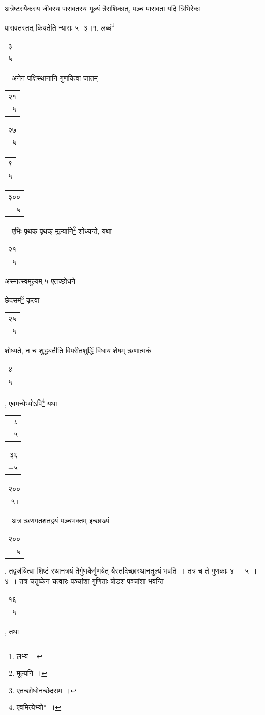 \documentclass[10pt, openany]{book}
\begin{document}
{{{अत्रेष्टस्यैकस्य जीवस्य पारावतस्य मूल्यं त्रैराशिकात्, पञ्च पारावता
यदि त्रिभिरेकः}
{पारावतस्तत् कियतेति न्यासः ५।३।१, लब्धं\renewcommand{\thefootnote}{\s २}\footnote{\s लभ्य~।}\begin{tabular}{r}३ \\५ \end{tabular}। अनेन पक्षिस्थानानि
गुणयित्वा जातम्\begin{tabular}{r|}२१\\५ \end{tabular}
\begin{tabular}{r|}२७ \\५\end{tabular}\begin{tabular}{r|}९\\५\end{tabular}\begin{tabular}{r}३००\\५\end{tabular}। एभिः
पृथक् पृथक् मूल्यानि\renewcommand{\thefootnote}{\s ३}\footnote{\s मूल्यनि~।} शोध्यन्ते, यथा\begin{tabular}{r}२१\\ ५\end{tabular}अस्मात्स्वमूल्यम् ५
एतच्छोधने}
{छेदसमं\renewcommand{\thefootnote}{\s ४}\footnote{\s एतच्छोधोनच्छेदसम~।} कृत्वा\begin{tabular}{r}२५\\ ५\end{tabular}शोध्यते, न च शुद्ध्यतीति विपरीतशुद्धिं विधाय शेषम् ऋणात्मकं \begin{tabular}{l}४\\ ५+\end{tabular}, एवमन्येभ्योऽपि\renewcommand{\thefootnote}{\s ५}\footnote{\s एवमित्येभ्यो*~।} यथा\begin{tabular}{r}८\\ +५\end{tabular}\begin{tabular}{|r} ३६\\ +५\end{tabular}\begin{tabular}{|r}२००\\ ५+\end{tabular}। अत्र
ऋणगतशतद्वयं पञ्चभक्तम् इच्छाख्यं \begin{tabular}{r}२००\\ ५\end{tabular}, तद्वर्जयित्वा शिष्टं स्थानत्रयं तैर्गुणकैर्गुणयेत् यैस्तदिच्छास्थानतुल्यं भवति~। तत्र च ते गुणकाः ४~। ५~। ४~। तत्र चतुष्केन चत्वारः पञ्चांशा गुणिताः षोडश पञ्चांशा भवन्ति\begin{tabular}{r}१६\\ ५\end{tabular}, तथा}
}}
\end{document}
